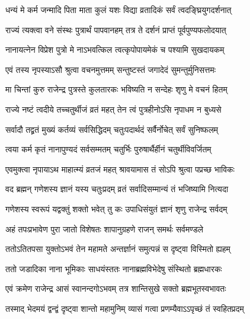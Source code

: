 \twolineshloka
{धन्यं मे कर्म जन्मादि पिता माता कुलं यशः}
{विद्या व्रतादिकं सर्वं त्वदङ्घ्रियुगदर्शनात्} %

\twolineshloka
{राज्यं त्यक्त्वा वने संस्थः पुत्रार्थं पापवानहम्}
{तत्र ते दर्शनं प्राप्तं पूर्वपुण्यफलोदयात्} %

\twolineshloka
{नानायत्नेन विप्रेश पुत्रो मे नाऽभवत्किल}
{त्वत्कृपोपायमेकं च पश्यामि सुखदायकम्} %


\twolineshloka
{एवं तस्य नृपस्याऽसौ श्रुत्वा वचनमुत्तमम्}
{सन्तुष्टस्तं जगादेदं सुमन्तुर्मुनिसत्तमः} %


\twolineshloka
{मा चिन्तां कुरु राजेन्द्र पुत्रस्ते कुलतारकः}
{भविष्यति न सन्देहः श‍ृणु मे वचनं हितम्} %

\twolineshloka
{राज्ये नष्टं त्वदीये तच्चतुर्थीजं व्रतं महत्}
{तेन त्वं पुत्रहीनोऽसि नृपाधम न बुध्यसे} %

\twolineshloka
{सर्वादौ तद्व्रतं मुख्यं कर्तव्यं सर्वसिद्धिदम्}
{चतुःपदार्थदं सर्वैर्नोचेत् सर्वं सुनिष्फलम्} %

\twolineshloka
{त्वया कर्म कृतं नानापुण्यदं सर्वसम्मतम्}
{चतुर्भिः पुरुषार्थैर्हीनं चतुर्थीविवर्जितम्} %

\twolineshloka
{एवमुक्त्वा नृपायाऽथ माहात्म्यं व्रतजं महत्}
{श्रावयामास तं सोऽपि श्रुत्वा पप्रच्छ भाविकः} %


\twolineshloka
{वद ब्रह्मन् गणेशस्य ज्ञानं यस्य चतुःप्रदम्}
{व्रतं सर्वादिसम्मान्यं तं भजिष्यामि नित्यदा} %


\twolineshloka
{गणेशस्य स्वरूपं यद्वक्तुं शक्तो भवेत् तु कः}
{उपाधिसंयुतं ज्ञानं श‍ृणु राजेन्द्र सर्वदम्} %

\twolineshloka
{अहं तपःप्रभावेण पुरा जातो विशेषतः}
{शापानुग्रहणे राजन् समर्थः सर्वमण्डले} %

\twolineshloka
{ततोऽतितपसा युक्तोऽभवं तेन महामते}
{अन्तर्ज्ञानं समुत्पन्नं स दृष्ट्वा विस्मितो ह्यहम्} %

\twolineshloka
{ततो जडादिका नाना भूमिकाः साधयंस्ततः}
{नानाब्रह्मविभेदेषु संस्थितो ब्रह्मधारकः} %

\twolineshloka
{एवं क्रमेण राजेन्द्र आसं स्वानन्दगोऽभवम्}
{तत्र शान्तिसुखे सक्तो ब्रह्मभूतस्वभावतः} %

\twolineshloka
{तस्माद् भेदमयं द्वन्द्वं दृष्ट्वा शान्तो महामुनिम्}
{व्यासं गत्वा प्रणम्यैवाऽऽपृच्छं तं स्वहितप्रदम्} %

